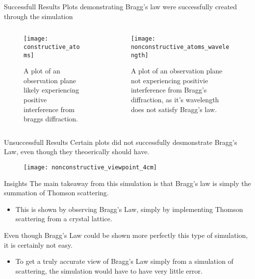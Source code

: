 \documentclass[aspectratio=169]{beamer}
\begin{document}
\begin{frame}{Successfull Results}
	Plots demonstrating Bragg's law were successfully created through the simulation	
	\begin{columns}
	\begin{column}{.5\textwidth}
	\begin{figure}
		\texttt{[image: constructive\_atoms]}
		\caption{A plot of an observation plane likely experiencing positive interference from braggs diffraction.}
	\end{figure}
	\end{column}
	
	\begin{column}{.5\textwidth}
		\begin{figure}
			\texttt{[image: nonconstructive\_atoms\_wavelength]}
			\caption{A plot of an observation plane not experiencing positivie interference from Bragg's diffraction, as it's wavelength does not satisfy Bragg's law.}
		\end{figure}
	\end{column}
	\end{columns}
	
\end{frame}

\begin{frame}{Unsuccessfull Results}
	Certain plots did not successfully desmonstrate Bragg's Law, even though they theoerically should have.
	\begin{figure}
		\texttt{[image: nonconstructive\_viewpoint\_4cm]}
	\end{figure}
\end{frame}

\begin{frame}{Insights}
	The main takeaway from this simulation is that Bragg's law is simply the summation of Thomson scattering.
	\begin{itemize}
		\item This is shown by observing Bragg's Law, simply by implementing Thomson scattering from a crystal lattice.
	\end{itemize}
	
	Even though Bragg's Law could be shown more perfectly this type of simulation, it is certainly not easy.
		\begin{itemize}
			\item To get a truly accurate view of Bragg's Law simply from a simulation of scattering, the simulation would have to have very little error.
		\end{itemize}
\end{frame}
\end{document}
